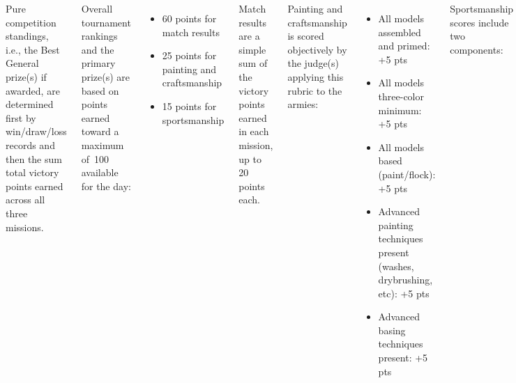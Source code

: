 \documentclass{40k}
\begin{document}
\begin{columns}
Pure competition standings, i.e., the Best General prize(s) if
awarded, are determined first by win/draw/loss records and then the
sum total victory points earned across all three missions.

Overall tournament rankings and the primary prize(s) are based on
points earned toward a maximum of~100 available for the day:
\begin{itemize}\shortlist
\item 60 points for match results
\item 25 points for painting and craftsmanship
\item 15 points for sportsmanship
\end{itemize}

Match results are a simple sum of the victory points earned in each
mission, up to 20 points each.

Painting and craftsmanship is scored objectively by the judge(s)
applying this rubric to the armies:

\begin{itemize}\shortlist
\item All models assembled and primed: +5 pts
\item All models three-color minimum: +5 pts
\item All models based (paint/flock): +5 pts
\item Advanced painting techniques present (washes, drybrushing, etc): +5 pts
\item Advanced basing techniques present: +5 pts
\end{itemize}

Sportsmanship scores include two components:
\begin{itemize}\shortlist
\item The sum of sportsmanship scores given after each mission (9 pts
  available).

\item Players ranking their opponents by most enjoyable to play (6 pts
  available).
\end{itemize}

Please make sure to submit sportsmanship scores as appropriate,
including the final ranking, as otherwise it impairs your opponents'
overall scores!

\end{columns}



% 









\end{document}
